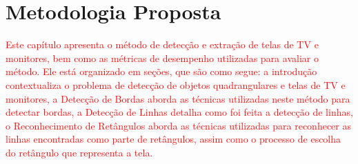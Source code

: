 
\chapter{Metodologia Proposta} \label{met}




\textcolor{red}{Este capítulo apresenta o método de detecção e extração de telas de TV e monitores, bem como as métricas de desempenho utilizadas para avaliar o método. Ele está organizado em seções, que são como segue: a introdução contextualiza o problema de detecção de objetos quadrangulares e telas de TV e monitores, a Detecção de Bordas aborda as técnicas utilizadas neste método para detectar bordas, a Detecção de Linhas detalha como foi feita a detecção de linhas, o Reconhecimento de Retângulos aborda as técnicas utilizadas para reconhecer as linhas encontradas como parte de retângulos, assim como o processo de escolha do retângulo que representa a tela.}

